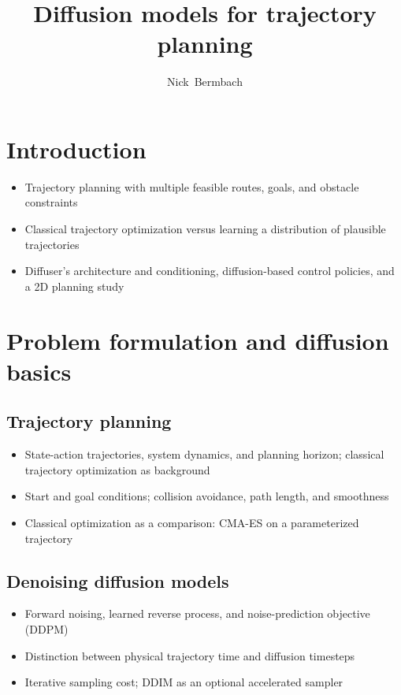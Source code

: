 \documentclass[a4paper]{IEEEtran}
\title{Diffusion models for trajectory planning}
\author{Nick~Bermbach}
\begin{document}
\maketitle

\section{Introduction}
\begin{itemize}
    \item Trajectory planning with multiple feasible routes, goals, and obstacle constraints
    \item Classical trajectory optimization versus learning a distribution of plausible trajectories
    \item Diffuser's architecture and conditioning, diffusion-based control policies, and a 2D planning study
\end{itemize}

\section{Problem formulation and diffusion basics}
\subsection{Trajectory planning}
\begin{itemize}
    \item State-action trajectories, system dynamics, and planning horizon; classical trajectory optimization as background~\cite{kelly2017trajectory}
    \item Start and goal conditions; collision avoidance, path length, and smoothness
    \item Classical optimization as a comparison: CMA-ES on a parameterized trajectory~\cite{hansen2016cma}
\end{itemize}
\subsection{Denoising diffusion models}
\begin{itemize}
    \item Forward noising, learned reverse process, and noise-prediction objective (DDPM)~\cite{ho2020ddpm}
    \item Distinction between physical trajectory time and diffusion timesteps
    \item Iterative sampling cost; DDIM as an optional accelerated sampler~\cite{song2021ddim}
\end{itemize}
\end{document}
